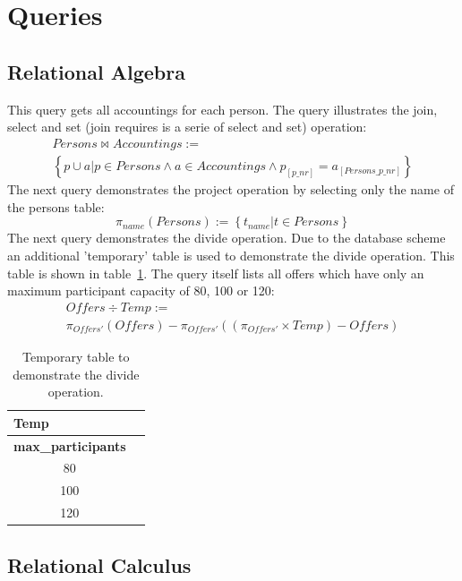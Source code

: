 \documentclass[12pt,a4paper,ngerman]{article}
\begin{document}
\newpage

\section{Queries}
\subsection{Relational Algebra}
This query gets all accountings for each person. The query illustrates the join, select and set (join requires is a serie of select and set) operation:
\begin{gather}
Persons \bowtie{}_{}Accountings := \nonumber \\ 
\left\{ p \cup a | p \in Persons \wedge a \in Accountings \wedge p_{[p\_nr]} = a_{[Persons\_p\_nr]} \right\}
\end{gather}
The next query demonstrates the project operation by selecting only the name of the persons table:
\begin{equation}
\pi{}_{name}(Persons) := \left\{ t_{name} | t \in Persons \right\}
\end{equation}
The next query demonstrates the divide operation. Due to the database scheme an additional 'temporary' table is used to demonstrate the divide operation. This table is shown in table~\ref{tbl:temp}. The query itself lists all offers which have only an maximum participant capacity of 80, 100 or 120:
\begin{gather}
	Offers \div Temp := \nonumber \\
	\pi_{Offers'}(Offers) - \pi_{Offers'}((\pi_{Offers'} \times Temp)-Offers)
\end{gather}

\begin{table}[h]
	\centering
	\begin{tabular}{| c | c |}
		\hline
		\multicolumn{1}{|l|}{\textbf{Temp}} \\ \hline
		\textbf{max\_participants}               \\ \hline \hline
		80											\\ \hline
		100											\\ \hline
		120											\\ \hline
	\end{tabular}
	\caption{Temporary table to demonstrate the divide operation. \label{tbl:temp}}
\end{table}

\subsection{Relational Calculus}
\end{document}
